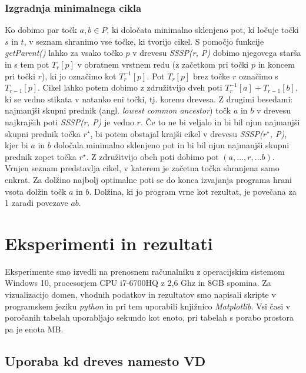 \documentclass[a4paper, 12pt]{book}
\begin{document}
\subsection{Izgradnja minimalnega cikla}
Ko dobimo par točk $a, b\in P$, ki določata minimalno sklenjeno pot, ki ločuje točki $s$ in $t$, v seznam shranimo vse točke, ki tvorijo cikel. S pomočjo funkcije \textit{getParent()} lahko za vsako točko $p$ v drevesu \textit{SSSP(r, P)} dobimo njegovega starša in s tem pot $T_r[p]$ v obratnem vrstnem redu (z začetkom pri točki $p$ in koncem pri točki $r$), ki jo označimo kot $T_r^{-1}[p]$. Pot $T_r[p]$ brez točke $r$ označimo s $T_{r-1}[p]$. Cikel lahko potem dobimo z združitvijo dveh poti $T_r^{-1}[a] + T_{r-1}[b]$, ki se vedno stikata v natanko eni točki, tj. korenu drevesa. Z drugimi besedami: najmanjši skupni prednik (angl. \textit{lowest common ancestor}) točk $a$ in $b$ v drevesu najkrajših poti \textit{SSSP(r, P)} je vedno $r$. Če to ne bi veljalo in bi bil njun najmanjši skupni prednik točka $r^\star$, bi potem obstajal krajši cikel v drevesu \textit{SSSP($r^\star$, P)}, kjer bi $a$ in $b$ določala minimalno sklenjeno pot in bi bil njun najmanjši skupni prednik zopet točka $r^\star$. Z združitvijo obeh poti dobimo pot $(a,...,r,...b)$. Vrnjen seznam predstavlja cikel, v katerem je začetna točka shranjena samo enkrat. Za dolžino najbolj optimalne poti se do konca izvajanja programa hrani vsota dolžin točk $a$ in $b$. Dolžina, ki jo program vrne kot rezultat, je povečana za 1 zaradi povezave $ab$. 


\chapter{Eksperimenti in rezultati}
\label{Rezultati}
Eksperimente smo izvedli na prenosnem računalniku z operacijskim sistemom Windows 10, procesorjem CPU i7-6700HQ z 2,6 Ghz in 8GB spomina. Za vizualizacijo domen, vhodnih podatkov in rezultatov smo napisali skripte v programskem jeziku \textit{python} in pri tem uporabili knjižnico \textit{Matplotlib}. Vsi časi v poročanih tabelah uporabljajo sekundo kot enoto, pri tabelah s porabo prostora pa je enota MB.
\section{Uporaba kd dreves namesto VD}
\end{document}
